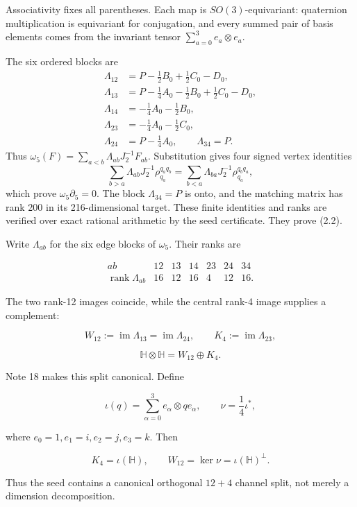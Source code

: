 \documentclass[
  11pt,
  a4paper,
]{article}
\begin{document}
Associativity fixes all parentheses. Each map is \(SO(3)\)-equivariant:
quaternion multiplication is equivariant for conjugation, and every
summed pair of basis elements comes from the invariant tensor
\(\sum_{a=0}^3e_a\otimes e_a\).

The six ordered blocks are \[
\begin{aligned}
\Lambda_{12}&=P-\tfrac12B_0+\tfrac12C_0-D_0,\\
\Lambda_{13}&=P-\tfrac14A_0-\tfrac12B_0+\tfrac12C_0-D_0,\\
\Lambda_{14}&=-\tfrac14A_0-\tfrac12B_0,\\
\Lambda_{23}&=-\tfrac14A_0-\tfrac12C_0,\\
\Lambda_{24}&=P-\tfrac14A_0,\qquad \Lambda_{34}=P.
\end{aligned}
\] Thus \(\omega_5(F)=\sum_{a<b}\Lambda_{ab}J_2^{-1}F_{ab}\).
Substitution gives four signed vertex identities \[
\sum_{b>a}\Lambda_{ab}J_2^{-1}\rho_{q_a}^{q_aq_b}
=\sum_{b<a}\Lambda_{ba}J_2^{-1}\rho_{q_a}^{q_bq_a},
\] which prove \(\omega_5\partial_5=0\). The block \(\Lambda_{34}=P\) is
onto, and the matching matrix has rank 200 in its 216-dimensional
target. These finite identities and ranks are verified over exact
rational arithmetic by the seed certificate. They prove (2.2).

Write \(\Lambda_{ab}\) for the six edge blocks of \(\omega_5\). Their
ranks are

\[
\begin{array}{c|rrrrrr}
ab&12&13&14&23&24&34\\ \hline
\operatorname{rank}\Lambda_{ab}&16&12&16&4&12&16.
\end{array}
\tag{2.4}
\]

The two rank-12 images coincide, while the central rank-4 image supplies
a complement:

\[
W_{12}:=\operatorname{im}\Lambda_{13}
=\operatorname{im}\Lambda_{24},
\qquad
K_4:=\operatorname{im}\Lambda_{23},
\tag{2.5}
\]

\[
\mathbb H\otimes\mathbb H=W_{12}\oplus K_4.
\tag{2.6}
\]

Note 18 makes this split canonical. Define

\[
\iota(q)=\sum_{\alpha=0}^{3}e_\alpha\otimes qe_\alpha,
\qquad
\nu=\frac14\iota^*,
\tag{2.7}
\]

where \(e_0=1,e_1=i,e_2=j,e_3=k\). Then

\[
\boxed{
K_4=\iota(\mathbb H),
\qquad
W_{12}=\ker\nu=\iota(\mathbb H)^\perp.
}
\tag{2.8}
\]

Thus the seed contains a canonical orthogonal \(12+4\) channel split,
not merely a dimension decomposition.
\end{document}

